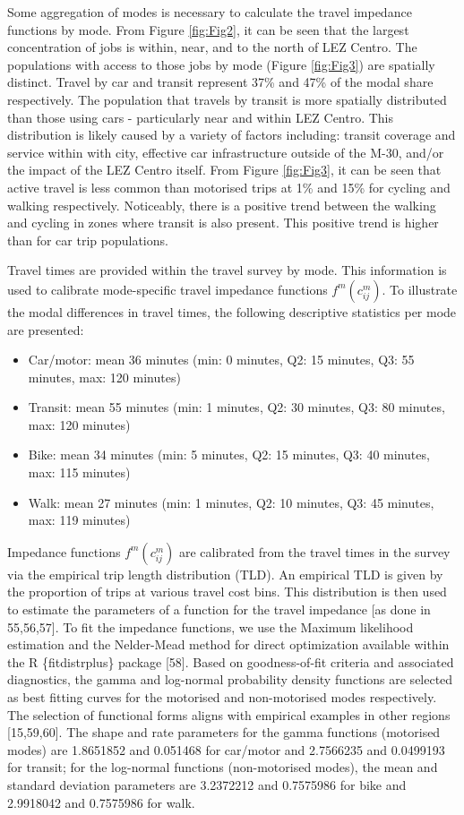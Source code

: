\documentclass[10pt,letterpaper]{article}
\providecommand{\tightlist}{%
  \setlength{\itemsep}{0pt}\setlength{\parskip}{0pt}}
\begin{document}
Some aggregation of modes is necessary to calculate the travel impedance
functions by mode. From Figure \ref{fig:Fig2}, it can be seen that the
largest concentration of jobs is within, near, and to the north of LEZ
Centro. The populations with access to those jobs by mode (Figure
\ref{fig:Fig3}) are spatially distinct. Travel by car and transit
represent 37\% and 47\% of the modal share respectively. The population
that travels by transit is more spatially distributed than those using
cars - particularly near and within LEZ Centro. This distribution is
likely caused by a variety of factors including: transit coverage and
service within with city, effective car infrastructure outside of the
M-30, and/or the impact of the LEZ Centro itself. From Figure
\ref{fig:Fig3}, it can be seen that active travel is less common than
motorised trips at 1\% and 15\% for cycling and walking respectively.
Noticeably, there is a positive trend between the walking and cycling in
zones where transit is also present. This positive trend is higher than
for car trip populations.

Travel times are provided within the travel survey by mode. This
information is used to calibrate mode-specific travel impedance
functions \(f^m(c_{ij}^m)\). To illustrate the modal differences in
travel times, the following descriptive statistics per mode are
presented:

\begin{itemize}
\tightlist
\item
  Car/motor: mean 36 minutes (min: 0 minutes, Q2: 15 minutes, Q3: 55
  minutes, max: 120 minutes)
\item
  Transit: mean 55 minutes (min: 1 minutes, Q2: 30 minutes, Q3: 80
  minutes, max: 120 minutes)
\item
  Bike: mean 34 minutes (min: 5 minutes, Q2: 15 minutes, Q3: 40 minutes,
  max: 115 minutes)
\item
  Walk: mean 27 minutes (min: 1 minutes, Q2: 10 minutes, Q3: 45 minutes,
  max: 119 minutes)
\end{itemize}

Impedance functions \(f^m(c_{ij}^m)\) are calibrated from the travel
times in the survey via the empirical trip length distribution (TLD). An
empirical TLD is given by the proportion of trips at various travel cost
bins. This distribution is then used to estimate the parameters of a
function for the travel impedance {[}as done in 55,56,57{]}. To fit the
impedance functions, we use the Maximum likelihood estimation and the
Nelder-Mead method for direct optimization available within the R
\{fitdistrplus\} package {[}58{]}. Based on goodness-of-fit criteria and
associated diagnostics, the gamma and log-normal probability density
functions are selected as best fitting curves for the motorised and
non-motorised modes respectively. The selection of functional forms
aligns with empirical examples in other regions {[}15,59,60{]}. The
shape and rate parameters for the gamma functions (motorised modes) are
1.8651852 and 0.051468 for car/motor and 2.7566235 and 0.0499193 for
transit; for the log-normal functions (non-motorised modes), the mean
and standard deviation parameters are 3.2372212 and 0.7575986 for bike
and 2.9918042 and 0.7575986 for walk.
\end{document}
